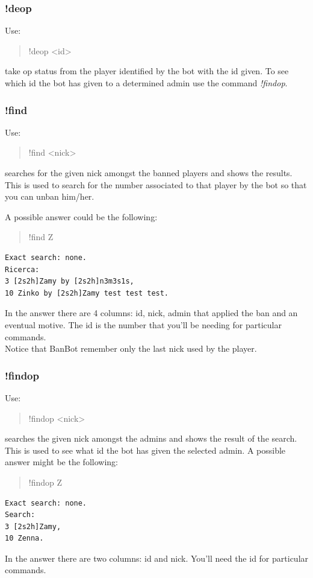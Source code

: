 \documentclass[a4paper]{article}
\begin{document}
\subsubsection{!deop}
Use:
\begin{quote}
!deop \textless{}id\textgreater{}
\end{quote}
take op status from the player identified by the bot with the id given. To see which id the bot has given to a determined admin
use the command \textit{!findop}.

\subsubsection{!find}
Use:
\begin{quote}
!find \textless{}nick\textgreater{}
\end{quote}
searches for the given nick amongst the banned players and shows the results.\\
This is used to search for the number associated to that player by the bot so that you can unban him/her.

A possible answer could be the following:
\begin{quote}
!find Z
\end{quote}
\begin{lstlisting}
Exact search: none.
Ricerca:
3 [2s2h]Zamy by [2s2h]n3m3s1s,
10 Zinko by [2s2h]Zamy test test test.
\end{lstlisting}
In the answer there are 4 columns: id, nick, admin that applied the ban and an eventual motive.
The id is the number that you'll be needing for particular commands.\\
Notice that BanBot remember only the last nick used by the player.

\subsubsection{!findop}
Use:
\begin{quote}
!findop \textless{}nick\textgreater{}
\end{quote}
searches the given nick amongst the admins and shows the result of the search.\\
This is used to see what id the bot has given the selected admin.
A possible answer might be the following:
\begin{quote}
!findop Z
\end{quote}
\begin{lstlisting}
Exact search: none.
Search:
3 [2s2h]Zamy,
10 Zenna.
\end{lstlisting}
In the answer there are two columns: id and nick.
You'll need the id for particular commands.
\end{document}
